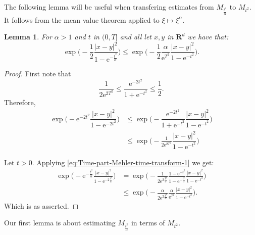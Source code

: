 \documentclass[a4paper,oneside,10pt]{amsproc}
\theoremstyle{plain}
\newtheorem{lemma}{Lemma}
\theoremstyle{remark}
\theoremstyle{definition}
\renewcommand{\leq}{\leqslant}
\renewcommand{\leq}{\leqslant}
\newcommand{\R}{\mathbf R}
\newcommand{\e}{\mathrm{e}} %
\renewcommand{\leq}{\leqslant}%
\begin{document}
The following lemma will be useful when transfering estimates from
$M_{\frac{t^2}{\alpha}}$ to $M_{t^2}$. It follows from the mean value
theorem applied to $\xi \mapsto \xi^\alpha$.
\begin{lemma}\label{lem:Exponential-estimates}
  For $\alpha > 1$ and $t$ in $(0, T]$ and all let $x, y$ in $\R^d$
  we have that:
  \begin{equation}
    \label{eq:Exponential-estimates-1}
    \exp \biggl (-\frac12\frac{|x - y|^2}{1 - \e^{-\frac{t^2}\alpha}}
    \biggr ) \leq  \exp \biggl (-\frac12\frac{\alpha}{\e^{T^2}} \frac{|x -
      y|^2}{1 - \e^{-t^2}} \biggr ).
  \end{equation}
\end{lemma}
\begin{proof}
First note that
\begin{equation*}
  \frac1{2 \e^{2T^2}} \leq \frac{\e^{-2t^2}}{1 + \e^{-t^2}} \leq \frac12.
\end{equation*}
Therefore,
\begin{align*}
 \exp\biggl(-\e^{-2t^2} \dfrac{|x - y|^2}{1 - \e^{-2 t^2}} \biggr)
 &\leq \exp\biggl(-\dfrac{\e^{-2t^2}}{1 + \e^{-t^2}} \dfrac{|x -
   y|^2}{1 - \e^{-t^2}} \biggr)\\
 &\leq \exp\biggl(-\frac1{2\e^{2T^2}} \dfrac{|x - y|^2}{1 - \e^{-t^2}} \biggr)
\end{align*}




  Let $t > 0$. Applying
  \eqref{eq:Time-part-Mehler-time-transform-1} we get:
  \begin{align*}
    \exp \biggl (-\e^{-\frac{t^2}\alpha} \frac{|x - y|^2}{1 - \e^{-2\frac{t^2}\alpha}}
    \biggr ) &= \exp \biggl (-\frac1{2\e^{2\frac{T^2}{\alpha}}} \frac{1
      - \e^{-t^2}}{1 - \e^{-\frac{t^2}\alpha}}  \frac{|x - y|^2}{1 - \e^{-t^2}} \biggr )\\
    &\leq \exp \biggl(-\frac{\alpha}{2\e^{2\frac{T^2}{\alpha}}}
    \frac{\alpha}{\e^{T^2}} \frac{|x - y|^2}{1 - \e^{-t^2}} \biggr).
  \end{align*}
  Which is as asserted.
\end{proof}
Our first lemma is about estimating $M_{\frac{t^2}\alpha}$ in terms of
$M_{t^2}$.
\end{document}
